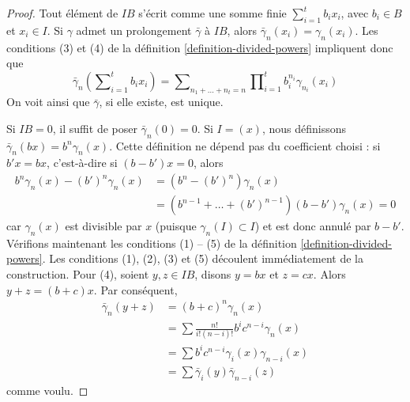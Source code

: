 \begin{proof}
Tout élément de $IB$ s'écrit comme une somme finie
$\sum\nolimits_{i=1}^t b_ix_i$, avec
$b_i \in B$ et $x_i \in I$. Si $\gamma$ admet un prolongement $\bar\gamma$ à $IB$,
alors $\bar\gamma_n(x_i) = \gamma_n(x_i)$.
Les conditions (3) et (4) de la
définition \ref{definition-divided-powers} impliquent donc que
$$
\bar\gamma_n(\sum\nolimits_{i=1}^t b_ix_i) =
\sum\nolimits_{n_1 + \ldots + n_t = n}
\prod\nolimits_{i = 1}^t b_i^{n_i}\gamma_{n_i}(x_i)
$$
On voit ainsi que $\bar\gamma$, si elle existe, est unique.

\medskip\noindent
Si $IB = 0$, il suffit de poser $\bar\gamma_n(0) = 0$. Si $I = (x)$,
nous définissons $\bar\gamma_n(bx) = b^n\gamma_n(x)$. Cette définition ne dépend pas du coefficient choisi
: si $b'x = bx$, c'est-à-dire si $(b - b')x = 0$, alors
\begin{align*}
b^n\gamma_n(x) - (b')^n\gamma_n(x)
& =
(b^n - (b')^n)\gamma_n(x) \\
& =
(b^{n - 1} + \ldots + (b')^{n - 1})(b - b')\gamma_n(x) = 0
\end{align*}
car $\gamma_n(x)$ est divisible par $x$ (puisque
$\gamma_n(I) \subset I$) et est donc annulé par $b - b'$.
Vérifions maintenant les conditions (1) -- (5) de
la définition \ref{definition-divided-powers}. Les
conditions (1), (2), (3) et (5) découlent immédiatement de la
construction. Pour (4), soient $y, z \in IB$, disons $y = bx$ et $z = cx$. Alors
$y + z = (b + c)x$. Par conséquent,
\begin{align*}
\bar\gamma_n(y + z)
& =
(b + c)^n\gamma_n(x) \\
& =
\sum\frac{n!}{i!(n - i)!}b^ic^{n -i}\gamma_n(x) \\
& =
\sum b^ic^{n - i}\gamma_i(x)\gamma_{n - i}(x) \\
& =
\sum\bar\gamma_i(y)\bar\gamma_{n -i}(z)
\end{align*}
comme voulu.


\end{proof}
